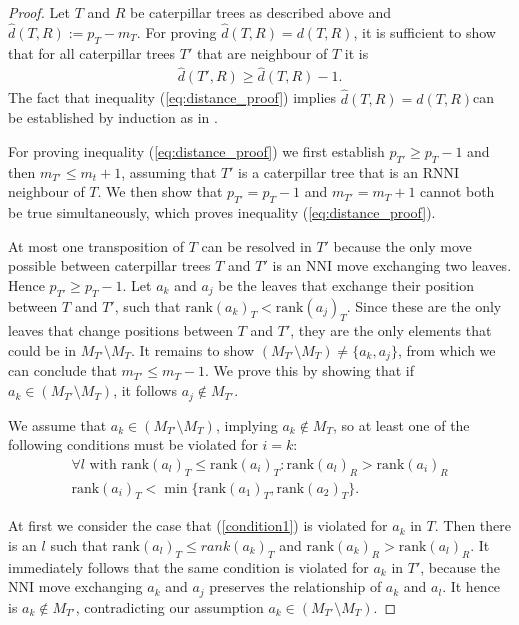 \documentclass[11pt]{amsart}
\newcommand{\rnni}{\mathrm{RNNI}}
\newcommand{\rank}{\mathrm{rank}}
\newcommand{\nni}{\mathrm{NNI}}
\begin{document}
\begin{proof}
	Let $T$ and $R$ be caterpillar trees as described above and $\hat d(T,R) := p_T - m_T$.
	For proving $\hat d(T,R) = d(T,R)$, it is sufficient to show that for all caterpillar trees $T'$ that are neighbour of $T$ it is
	\begin{align}
		\hat d(T',R) \geq \hat d(T,R) - 1.
		\label{eq:distance_proof}
	\end{align}
	The fact that inequality (\ref{eq:distance_proof}) implies $\hat d(T,R) = d(T,R)$can be established by induction as in \autocite[Theorem 1]{Collienne2020-iu}.

	For proving inequality (\ref{eq:distance_proof}) we first establish $p_{T'} \geq p_T - 1$ and then $m_{T'} \leq m_t + 1$, assuming that $T'$ is a caterpillar tree that is an $\rnni$ neighbour of $T$.
	We then show that $p_{T'} = p_T - 1$ and $m_{T'} = m_T + 1$ cannot both be true simultaneously, which proves inequality (\ref{eq:distance_proof}).

	At most one transposition of $T$ can be resolved in $T'$ because the only move possible between caterpillar trees $T$ and $T'$ is an $\nni$ move exchanging two leaves.
	Hence $p_{T'} \geq p_T - 1$.
	Let $a_k$ and $a_j$ be the leaves that exchange their position between $T$ and $T'$, such that $\rank(a_k)_T < \rank(a_j)_T$.
	Since these are the only leaves that change positions between $T$ and $T'$, they are the only elements that could be in $M_{T'} \setminus M_T$.
	It remains to show $(M_{T'} \setminus M_T) \neq \{a_k, a_j\}$, from which we can conclude that $m_{T'} \leq m_T - 1$.
	We prove this by showing that if $a_k \in (M_{T'} \setminus M_T)$, it follows $a_j \notin M_{T'}$.

	We assume that $a_k \in (M_{T'} \setminus M_T)$, implying $a_k \notin M_T$, so at least one of the following conditions must be violated for $i = k$:
	\setcounter{equation}{0} %
	\renewcommand{\theequation}{C\arabic{equation}}
	\begin{align}
		\forall l \text{ with } \rank(a_l)_T \leq \rank(a_i)_T: \rank(a_l)_R > \rank(a_i)_R \label{condition1}\\
		\rank(a_i)_T < \min\{\rank(a_1)_T, \rank(a_2)_T\}.
		\label{condition2}
	\end{align}
	\setcounter{equation}{1}
	\renewcommand{\theequation}{\arabic{equation}}

	At first we consider the case that (\ref{condition1}) is violated for $a_k$ in $T$.
	Then there is an $l$ such that $\rank(a_l)_T \leq rank(a_k)_T$ and $\rank(a_k)_R > \rank(a_l)_R$.
	It immediately follows that the same condition is violated for $a_k$ in $T'$, because the $\nni$ move exchanging $a_k$ and $a_j$ preserves the relationship of $a_k$ and $a_l$.
	It hence is $a_k \notin M_{T'}$, contradicting our assumption $a_k \in (M_{T'} \setminus M_T)$.


\end{proof}
\end{document}
